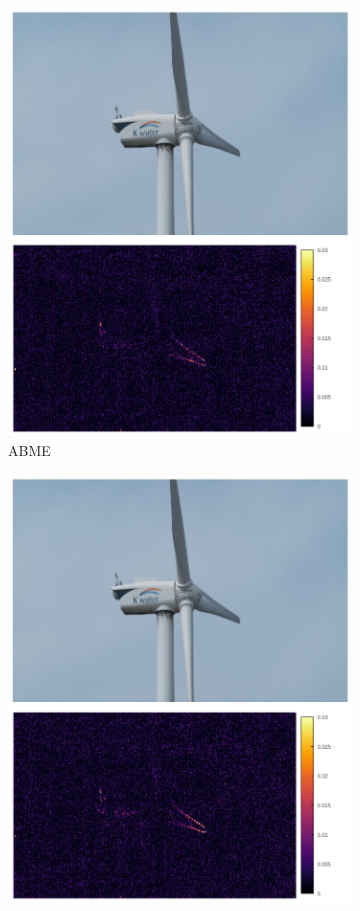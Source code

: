 \documentclass{article}
\begin{document}
\begin{figure}
\begin{subfigure}{0.25\textwidth}
    \includegraphics[width=1\linewidth]{qua_imgs/TEST02_045_f0465_abme.jpg}
    \caption{ABME}
\end{subfigure}%
\begin{subfigure}{0.25\textwidth}
	\centering
    \includegraphics[width=1\linewidth]{qua_imgs/TEST02_045_f0465_film.jpg}

\end{subfigure}
\end{figure}
\end{document}

